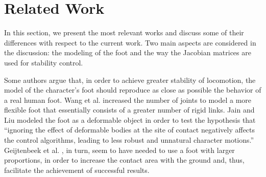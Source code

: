 \documentclass[tog]{acmsiggraph}
\begin{document}
\section{Related Work}



In this section, we present the most relevant works and discuss some of their differences with respect to the current work. Two main aspects
are considered in the discussion: the modeling of the foot and the way the Jacobian matrices are used for stability control.






Some authors argue that, in order to achieve greater stability of locomotion, the model of the character’s foot should reproduce as close as
possible the behavior of a real human foot. Wang et al.   increased the number of joints to model a more 
flexible foot that essentially consists of a greater number of rigid links. Jain and Liu  modeled the foot as a
deformable object in order to test the hypothesis that ``ignoring the effect of deformable bodies at the site of contact negatively affects
the control algorithms, leading to less robust and unnatural character motions.''
Geijtenbeek et al. , in turn, seem to have needed to use a foot with larger proportions, in order to increase the contact area with the ground and, thus, facilitate the achievement of successful results.
\end{document}
